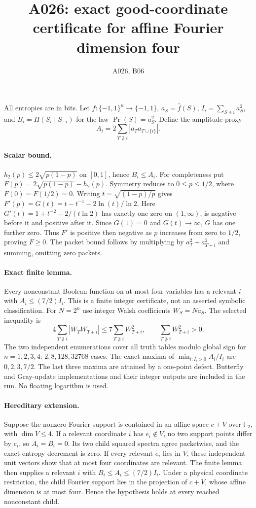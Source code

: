 \documentclass{article}
\begin{document}
\title{A026: exact good-coordinate certificate for affine Fourier dimension four}
\author{A026, B06}\maketitle
All entropies are in bits. Let $f:\{-1,1\}^n\to\{-1,1\}$,
$a_S=\widehat f(S)$, $I_i=\sum_{S\ni i}a_S^2$, and
$B_i=H(S_i\mid S_{-i})$ for the law $\Pr(S)=a_S^2$.
Define the amplitude proxy
\[
 A_i=2\sum_{T\not\ni i}|a_Ta_{T\cup\{i\}}|.
\]
\paragraph{Scalar bound.} $h_2(p)\le2\sqrt{p(1-p)}$ on $[0,1]$, hence $B_i\le A_i$.
For completeness put $F(p)=2\sqrt{p(1-p)}-h_2(p)$.
Symmetry reduces to $0\le p\le1/2$, where $F(0)=F(1/2)=0$.
Writing $t=\sqrt{(1-p)/p}$ gives
$F'(p)=G(t)=t-t^{-1}-2\ln(t)/\ln2$.
Here $G'(t)=1+t^{-2}-2/(t\ln2)$ has exactly one zero on $(1,\infty)$,
is negative before it and positive after it. Since $G(1)=0$ and $G(t)\to\infty$,
$G$ has one further zero. Thus $F'$ is positive then negative as $p$ increases
from zero to $1/2$, proving $F\ge0$. The packet bound follows by multiplying
by $a_T^2+a_{T+i}^2$ and summing, omitting zero packets.

\paragraph{Exact finite lemma.} Every nonconstant Boolean function on at most
four variables has a relevant $i$ with $A_i\le(7/2)I_i$.
This is a finite integer certificate, not an asserted symbolic classification.
For $N=2^n$ use integer Walsh coefficients $W_S=N a_S$. The selected inequality is
\[
4\sum_{T\not\ni i}|W_T W_{T+i}|\le7\sum_{T\not\ni i}W_{T+i}^2,
\qquad \sum_{T\not\ni i}W_{T+i}^2>0.
\]
The two independent enumerations cover all truth tables modulo global sign
for $n=1,2,3,4$: $2,8,128,32768$ cases. The exact maxima of
$\min_{i:I_i>0}A_i/I_i$ are $0,2,3,7/2$. The last three maxima are attained
by a one-point defect. Butterfly and Gray-update implementations and their
integer outputs are included in the run. No floating logarithm is used.

\paragraph{Hereditary extension.} Suppose the nonzero Fourier support is
contained in an affine space $c+V$ over $\mathbb F_2$, with $\dim V\le4$.
If a relevant coordinate $i$ has $e_i\notin V$, no two support points differ
by $e_i$, so $A_i=B_i=0$. Its two child squared spectra agree packetwise,
and the exact entropy decrement is zero. If every relevant $e_i$ lies in $V$,
these independent unit vectors show that at most four coordinates are relevant.
The finite lemma then supplies a relevant $i$ with $B_i\le A_i\le(7/2)I_i$.
Under a physical coordinate restriction, the child Fourier support lies in
the projection of $c+V$, whose affine dimension is at most four. Hence the
hypothesis holds at every reached nonconstant child.
\end{document}
